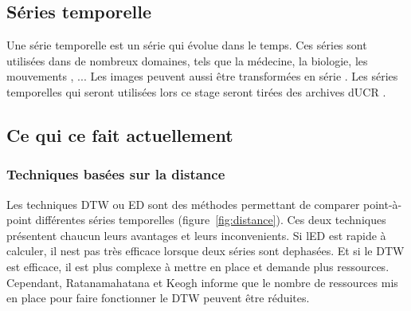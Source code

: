 \documentclass[11pt,final,ENIB]{sdm}
\begin{document}
	\subsection{S\'eries temporelle}
		Une s\'erie temporelle est un s\'erie qui \'evolue dans le temps. Ces s\'eries sont utilis\'ees dans de nombreux domaines, tels que la m\'edecine, la biologie, les mouvements \cite{ratanamahatana2004everything}, ... Les images peuvent aussi \^etre transform\'ees en s\'erie \cite{ratanamahatana2004everything}. Les s\'eries temporelles qui seront utilis\'ees lors ce stage seront tir\'ees des archives d\textquotesingle UCR \cite{UCRArchive}. 	

	\subsection{Ce qui ce fait actuellement}
	\label{seq:unknow}
		\subsubsection{Techniques bas\'ees sur la distance}
			Les techniques DTW ou ED sont des m\'ethodes permettant de comparer point-\`a-point diff\'erentes s\'eries temporelles (figure~\ref{fig:distance}). Ces deux techniques pr\'esentent chaucun leurs avantages et leurs inconvenients. Si l\textquotesingle ED est rapide \`a calculer, il n\textquotesingle est pas tr\`es efficace lorsque deux s\'eries sont dephas\'ees. Et si le DTW est efficace, il est plus complexe \`a mettre en place et demande plus ressources. Cependant, Ratanamahatana et Keogh \cite{ratanamahatana2005three} informe que le nombre de ressources mis en place pour faire fonctionner le DTW peuvent \^etre r\'eduites. 
\end{document}
